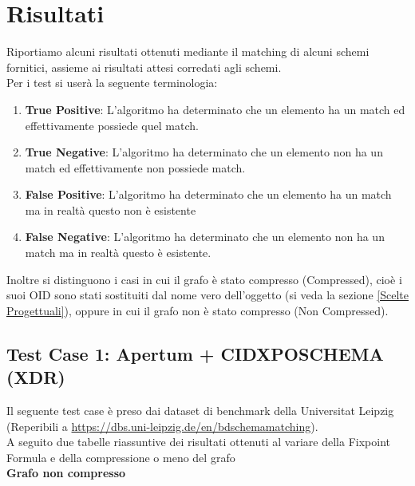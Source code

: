 \documentclass{article}
\begin{document}
\section{Risultati}

Riportiamo alcuni risultati ottenuti mediante il matching di alcuni schemi fornitici, assieme ai risultati attesi corredati agli schemi.\\

Per i test si userà la seguente terminologia:
\begin{enumerate}
	\item \textbf{True Positive}: L'algoritmo ha determinato che un elemento ha un match ed effettivamente possiede quel match.
	\item \textbf{True Negative}: L'algoritmo ha determinato che un elemento non ha un match ed effettivamente non possiede match.
	\item \textbf{False Positive}: L'algoritmo ha determinato che un elemento ha un match ma in realtà questo non è esistente 
	\item \textbf{False Negative}: L'algoritmo ha determinato che un elemento non ha un match ma in realtà questo è esistente.
\end{enumerate}

Inoltre si distinguono i casi in cui il grafo è stato compresso (Compressed), cioè i suoi OID sono stati sostituiti dal nome vero dell'oggetto (si veda la sezione \ref{Scelte Progettuali}), oppure in cui il grafo non è stato compresso (Non Compressed).

\subsection{Test Case 1: Apertum + CIDXPOSCHEMA (XDR)}

Il seguente test case è preso dai dataset di benchmark della Universitat Leipzig (Reperibili a \url{https://dbs.uni-leipzig.de/en/bdschemamatching}).\\

A seguito due tabelle riassuntive dei risultati ottenuti al variare della Fixpoint Formula e della compressione o meno del grafo\\

\textbf{Grafo non compresso}
\end{document}
